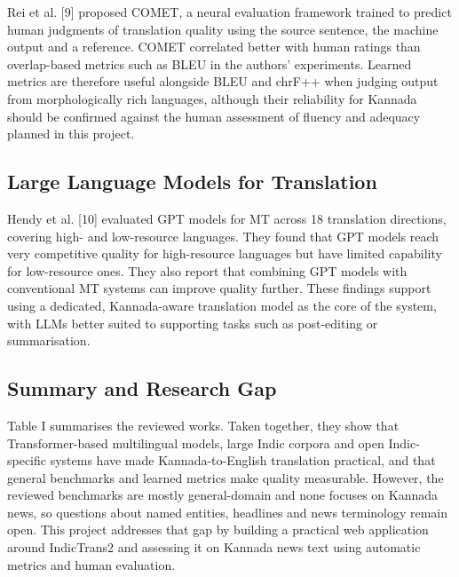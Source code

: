 \documentclass[conference]{IEEEtran}
\begin{document}
Rei et al. [9] proposed COMET, a neural evaluation framework trained to predict human judgments of translation quality using the source sentence, the machine output and a reference. COMET correlated better with human ratings than overlap-based metrics such as BLEU in the authors' experiments. Learned metrics are therefore useful alongside BLEU and chrF++ when judging output from morphologically rich languages, although their reliability for Kannada should be confirmed against the human assessment of fluency and adequacy planned in this project.

\subsection{Large Language Models for Translation}
Hendy et al. [10] evaluated GPT models for MT across 18 translation directions, covering high- and low-resource languages. They found that GPT models reach very competitive quality for high-resource languages but have limited capability for low-resource ones. They also report that combining GPT models with conventional MT systems can improve quality further. These findings support using a dedicated, Kannada-aware translation model as the core of the system, with LLMs better suited to supporting tasks such as post-editing or summarisation.

\subsection{Summary and Research Gap}
Table I summarises the reviewed works. Taken together, they show that Transformer-based multilingual models, large Indic corpora and open Indic-specific systems have made Kannada-to-English translation practical, and that general benchmarks and learned metrics make quality measurable. However, the reviewed benchmarks are mostly general-domain and none focuses on Kannada news, so questions about named entities, headlines and news terminology remain open. This project addresses that gap by building a practical web application around IndicTrans2 and assessing it on Kannada news text using automatic metrics and human evaluation.
\end{document}
